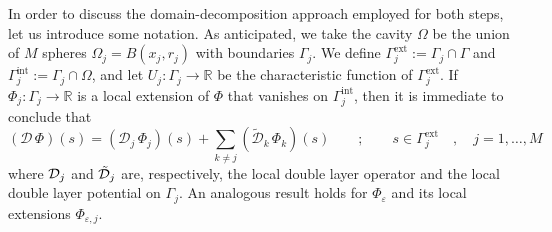 In order to discuss the domain-decomposition approach employed for both steps, let us introduce some notation. As anticipated, we take the cavity $\Omega$ be the union of $M$ spheres $\Omega_j = B(x_j, r_j)$ with boundaries $\Gamma_j$. We define $\Gamma_j^\text{ext}:= \Gamma_j \cap \Gamma$ and $\Gamma_j^\text{int} := \Gamma_j \cap \Omega$, and let $U_j: \Gamma_j \to \mathbb{R}$ be the characteristic function of $\Gamma_j^\text{ext}$. If $\Phi_j : \Gamma_j \to \mathbb{R}$ is a local extension of $\Phi$ that vanishes on $\Gamma_j^\text{int}$, then it is immediate to conclude that
\begin{equation}\label{eq:16}
(\mathcal{D} \, \Phi ) (s) = ( \mathcal{D}_j \, \Phi_j )(s) + \sum_{k \ne j} (\tilde{\mathcal{D}}_k \, \Phi_k )(s) \qquad ; \qquad s \in \Gamma_j^\text{ext} \quad, \quad  j = 1 , \ldots , M
\end{equation}
where $\mathcal{D}_j$ and $\tilde{\mathcal{D}}_j$ are, respectively, the local double layer operator and the local double layer potential on $\Gamma_j$. An analogous result holds for $\Phi_\varepsilon$ and its local extensions $\Phi_{\varepsilon,j}$. %

